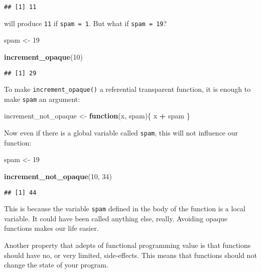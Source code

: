 \documentclass[
]{article}
\newenvironment{Shaded}{\begin{snugshade}}{\end{snugshade}}
\newcommand{\ControlFlowTok}[1]{\textcolor[rgb]{0.13,0.29,0.53}{\textbf{#1}}}
\newcommand{\DecValTok}[1]{\textcolor[rgb]{0.00,0.00,0.81}{#1}}
\newcommand{\KeywordTok}[1]{\textcolor[rgb]{0.13,0.29,0.53}{\textbf{#1}}}
\newcommand{\NormalTok}[1]{#1}
\newcommand{\OperatorTok}[1]{\textcolor[rgb]{0.81,0.36,0.00}{\textbf{#1}}}
\newcommand{\StringTok}[1]{\textcolor[rgb]{0.31,0.60,0.02}{#1}}
\begin{document}
\begin{verbatim}
## [1] 11
\end{verbatim}

will produce \texttt{11} if \texttt{spam\ =\ 1}. But what if \texttt{spam\ =\ 19}?

\begin{Shaded}
\begin{Highlighting}[]
\NormalTok{spam \textless{}{-}}\StringTok{ }\DecValTok{19}

\KeywordTok{increment\_opaque}\NormalTok{(}\DecValTok{10}\NormalTok{)}
\end{Highlighting}
\end{Shaded}

\begin{verbatim}
## [1] 29
\end{verbatim}

To make \texttt{increment\_opaque()} a referential transparent function, it is enough to make \texttt{spam} an
argument:

\begin{Shaded}
\begin{Highlighting}[]
\NormalTok{increment\_not\_opaque \textless{}{-}}\StringTok{ }\ControlFlowTok{function}\NormalTok{(x, spam)\{}
\NormalTok{    x }\OperatorTok{+}\StringTok{ }\NormalTok{spam}
\NormalTok{\}}
\end{Highlighting}
\end{Shaded}

Now even if there is a global variable called \texttt{spam}, this will not influence our function:

\begin{Shaded}
\begin{Highlighting}[]
\NormalTok{spam \textless{}{-}}\StringTok{ }\DecValTok{19}

\KeywordTok{increment\_not\_opaque}\NormalTok{(}\DecValTok{10}\NormalTok{, }\DecValTok{34}\NormalTok{)}
\end{Highlighting}
\end{Shaded}

\begin{verbatim}
## [1] 44
\end{verbatim}

This is because the variable \texttt{spam} defined in the body of the function is a local variable. It
could have been called anything else, really. Avoiding opaque functions makes our life easier.

Another property that adepts of functional programming value is that functions should have no, or
very limited, side-effects. This means that functions should not change the state of your program.
\end{document}
